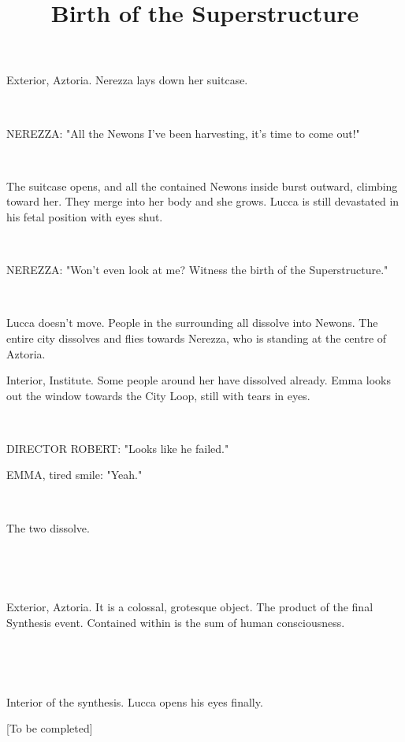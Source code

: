 \documentclass[11pt]{article}
\begin{document}
\ttfamily
\title{Birth of the Superstructure}
\maketitle


Exterior, Aztoria. 
Nerezza lays down her suitcase. 

\ 

NEREZZA: "All the Newons I've been harvesting, it's time to come out!"

\ 

The suitcase opens, and all the contained Newons inside burst outward, climbing toward her.
They merge into her body and she grows.
Lucca is still devastated in his fetal position with eyes shut.

\ 

NEREZZA: "Won't even look at me?
Witness the birth of the Superstructure."

\ 

Lucca doesn't move. 
People in the surrounding all dissolve into Newons.
The entire city dissolves and flies towards Nerezza, who is standing at the centre of Aztoria. 

Interior, Institute.
Some people around her have dissolved already.
Emma looks out the window towards the City Loop, still with tears in eyes.

\ 

DIRECTOR ROBERT: "Looks like he failed."

EMMA, tired smile: "Yeah."

\ 

The two dissolve.

\ 

\ 

Exterior, Aztoria.
It is a colossal, grotesque object.
The product of the final Synthesis event.
Contained within is the sum of human consciousness.

\ 

\ 

Interior of the synthesis. 
Lucca opens his eyes finally. 









[To be completed]
\end{document}
